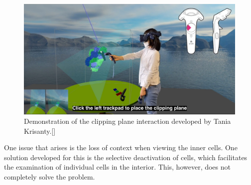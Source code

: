 \begin{figure}
	\vspace{-0.7cm}
	\includegraphics[width=1\linewidth]{fig/Images/Krisanty_clipping}
	\caption[]{Demonstration of the clipping plane interaction developed by Tania Krisanty.[\cite{krisanty_2022}]}
	\label{fig:tania}
\end{figure}
One issue that arises is the loss of context when viewing the inner cells. One solution developed for this is the selective deactivation of cells, which facilitates the examination of individual cells in the interior. This, however, does not completely solve the problem.

